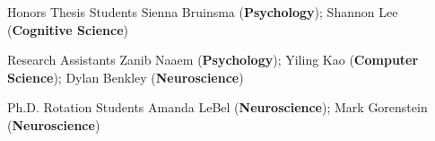 
\begin{cvskills}

  \cvskill
    {Honors Thesis Students}
    {Sienna Bruinsma (\textbf{Psychology}); Shannon Lee (\textbf{Cognitive Science})} %
    
  \cvskill
  	{Research Assistants}
    {Zanib Naaem (\textbf{Psychology}); Yiling Kao (\textbf{Computer Science}); Dylan Benkley (\textbf{Neuroscience})} %
    
  \cvskill
  	{Ph.D. Rotation Students}
    {Amanda LeBel (\textbf{Neuroscience}); Mark Gorenstein (\textbf{Neuroscience})}
    
\end{cvskills}
